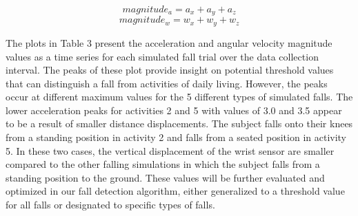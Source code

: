 \documentclass{llncs}
\begin{document}
	\begin{equation*}
    		magnitude_{a} = a_{x} + a_{y} + a_{z}
	\end{equation*} 
	\begin{equation*}
		magnitude_{w} = w_{x} + w_{y} + w_{z}
	\end{equation*} 
	
	
The plots in Table 3 present the acceleration and angular velocity magnitude values as a time series for each simulated fall trial over the data collection interval. The peaks of these plot provide insight on potential threshold values that can distinguish a fall from activities of daily living. However, the peaks occur at different maximum values for the 5 different types of simulated falls. The lower acceleration peaks for activities 2 and 5 with values of 3.0 and 3.5 appear to be a result of smaller distance displacements. The subject falls onto their knees from a standing position in activity 2 and falls from a seated position in activity 5. In these two cases, the vertical displacement of the wrist sensor are smaller compared to the other falling simulations in which the subject falls from a standing position to the ground. These values will be further evaluated and optimized in our fall detection algorithm, either generalized to a threshold value for all falls or designated to specific types of falls.
	
\end{document}
